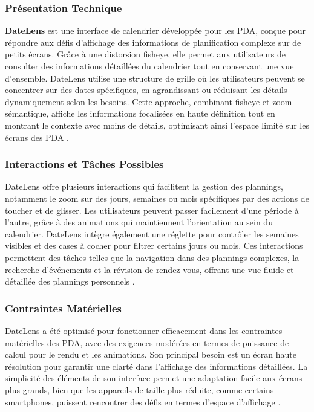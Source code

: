 \documentclass[runningheads]{llncs}
\begin{document}
\subsubsection{Présentation Technique}
\textbf{DateLens} est une interface de calendrier développée pour les PDA, conçue pour répondre aux défis d'affichage des informations de planification complexe sur de petits écrans. Grâce à une distorsion fisheye, elle permet aux utilisateurs de consulter des informations détaillées du calendrier tout en conservant une vue d’ensemble. DateLens utilise une structure de grille où les utilisateurs peuvent se concentrer sur des dates spécifiques, en agrandissant ou réduisant les détails dynamiquement selon les besoins. Cette approche, combinant fisheye et zoom sémantique, affiche les informations focalisées en haute définition tout en montrant le contexte avec moins de détails, optimisant ainsi l'espace limité sur les écrans des PDA \cite{bederson_datelens_2004}.

\subsubsection{Interactions et Tâches Possibles}
DateLens offre plusieurs interactions qui facilitent la gestion des plannings, notamment le zoom sur des jours, semaines ou mois spécifiques par des actions de toucher et de glisser. Les utilisateurs peuvent passer facilement d’une période à l’autre, grâce à des animations qui maintiennent l’orientation au sein du calendrier. DateLens intègre également une réglette pour contrôler les semaines visibles et des cases à cocher pour filtrer certains jours ou mois. Ces interactions permettent des tâches telles que la navigation dans des plannings complexes, la recherche d’événements et la révision de rendez-vous, offrant une vue fluide et détaillée des plannings personnels \cite{bederson_datelens_2004}.


\subsubsection{Contraintes Matérielles}
DateLens a été optimisé pour fonctionner efficacement dans les contraintes matérielles des PDA, avec des exigences modérées en termes de puissance de calcul pour le rendu et les animations. Son principal besoin est un écran haute résolution pour garantir une clarté dans l’affichage des informations détaillées. La simplicité des éléments de son interface permet une adaptation facile aux écrans plus grands, bien que les appareils de taille plus réduite, comme certains smartphones, puissent rencontrer des défis en termes d'espace d'affichage \cite{bederson_datelens_2004}.
\end{document}
